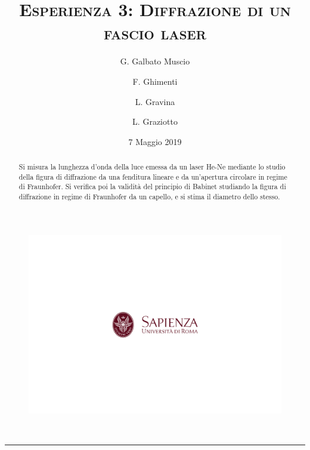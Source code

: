 \documentclass[10pt,oneside,a4paper]{article}
\title{\textsc{\textbf{Esperienza 3}: Diffrazione di un fascio laser}}
\author{\small{G. Galbato Muscio} \and \small{F. Ghimenti} \and \small{L. Gravina} \and \small{L. Graziotto}}
\date{7 Maggio 2019}
\begin{document}
	\begin{figure}
		\centering
		\includegraphics[scale=0.5, trim={2.8cm 8.9cm 0 9cm}, clip]{logo.png}
	\end{figure}
	\maketitle
	\begin{center} 
		 \\
	\end{center}
\hrule
\vfill
\renewcommand{\abstractname}{Abstract}
\begin{abstract}
Si misura la lunghezza d'onda della luce emessa da un laser He-Ne mediante lo studio della figura di diffrazione da una fenditura lineare e da un'apertura circolare in regime di Fraunhofer. Si verifica poi la validità del principio di Babinet studiando la figura di diffrazione in regime di Fraunhofer da un capello, e si stima il diametro dello stesso.
\end{abstract}
\vfill
\tableofcontents %
\newpage


\pagebreak
\end{document}
